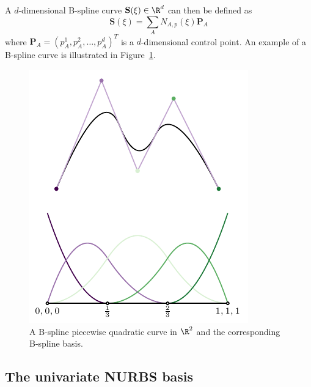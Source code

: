 A $d$-dimensional B-spline curve $\mathbf{S}(\xi)\in{\R^d}$ can then be defined as
\begin{equation}
    \mathbf{S}(\xi)=\sum_A N_{A,p}(\xi)\mathbf{P}_A
\end{equation}
where $\mathbf{P}_A=(p_A^1,p_A^2,\ldots,p_A^d)^T$ is a $d$-dimensional control point. An example of a B-spline curve is illustrated in Figure~\ref{fig:b-spline_and_geometry}.

\begin{figure}[ht]
    \center\includegraphics[scale=1.3]{geometry}
    \caption{A B-spline piecewise quadratic curve in $\R^2$ and the corresponding B-spline basis.}\label{fig:b-spline_and_geometry}
\end{figure}

\FloatBarrier
\subsection{The univariate NURBS basis}

